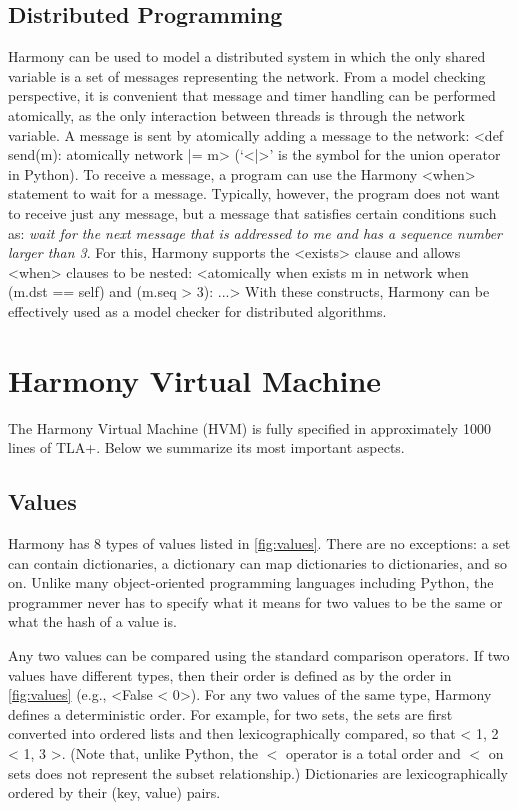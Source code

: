 \documentclass[twocolumn]{article}
\begin{document}
\subsection{Distributed Programming}

Harmony can be used to model a distributed system in which the
only shared variable is a set of messages representing the network.
From a model checking perspective, it is convenient that message and
timer handling can be performed atomically, as the only interaction
between threads is through the network variable.
A message is sent by atomically adding a message to the network:
<{def send(m): atomically network |= {m}}> (`<{|}>' is the symbol for
the union operator in Python).
To receive a message, a program can use the Harmony <{when}>
statement to wait for a message.  Typically, however, the program
does not want to receive just any message, but a message that satisfies
certain conditions such as: \emph{wait for the next message that is addressed
to me and has a sequence number larger than 3}.
For this, Harmony supports the <{exists}> clause and allows
<{when}> clauses to be nested:
<{atomically when exists m in network when (m.dst == self) and (m.seq > 3): ...}>
With these constructs, Harmony can be effectively used as a
model checker for distributed algorithms.

\section{Harmony Virtual Machine}

The Harmony Virtual Machine (HVM) is fully specified in approximately
1000 lines of TLA+.
Below we summarize its most important aspects.

\subsection{Values}

Harmony has 8 types of values listed in \autoref{fig:values}.
There are no exceptions: a set can contain dictionaries, a dictionary
can map dictionaries to dictionaries, and so on.  Unlike many
object-oriented programming languages including Python, the programmer never
has to specify what it means for two values to be the same or what the
hash of a value is.

Any two values can be compared using the standard comparison operators.
If two values have different types, then their order is defined as by
the order in \autoref{fig:values} (e.g., <{False < 0}>).
For any two values of the same type, Harmony defines a deterministic order.
For example, for two sets, the sets are first converted into ordered lists
and then lexicographically compared, so that <{{ 1, 2 } < { 1, 3 }}>.
(Note that, unlike Python, the $<$ operator is a total order and
$<$ on sets does not represent the subset relationship.)
Dictionaries are lexicographically ordered by their (key, value) pairs.
\end{document}
